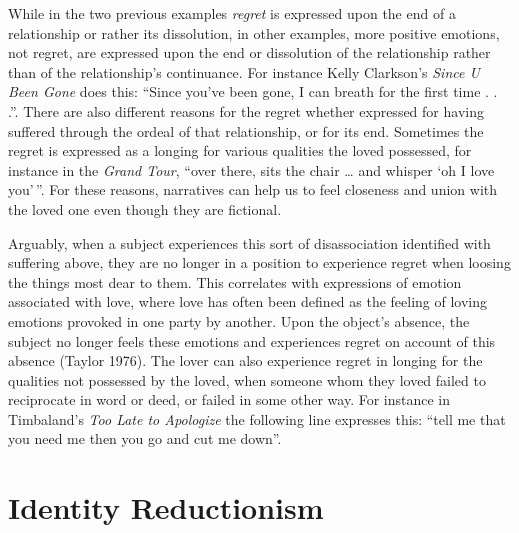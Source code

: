 \documentclass[
  letterpaper,
  DIV=11,
  numbers=noendperiod]{scrreprt}
\begin{document}
\begin{tcolorbox}[enhanced jigsaw, arc=.35mm, breakable, rightrule=.15mm, colback=white, colframe=quarto-callout-important-color-frame, bottomrule=.15mm, leftrule=.75mm, opacityback=0, toprule=.15mm, left=2mm]
\begin{tcolorbox}[enhanced jigsaw, arc=.35mm, breakable, rightrule=.15mm, colback=white, colframe=quarto-callout-tip-color-frame, bottomrule=.15mm, leftrule=.75mm, opacityback=0, toprule=.15mm, left=2mm]
While in the two previous examples \emph{regret} is expressed upon the
end of a relationship or rather its dissolution, in other examples, more
positive emotions, not regret, are expressed upon the end or dissolution
of the relationship rather than of the relationship's continuance. For
instance Kelly Clarkson's \emph{Since U Been Gone} does this: ``Since
you've been gone, I can breath for the first time . . .''. There are
also different reasons for the regret whether expressed for having
suffered through the ordeal of that relationship, or for its end.
Sometimes the regret is expressed as a longing for various qualities the
loved possessed, for instance in the \emph{Grand Tour}, ``over there,
sits the chair \ldots{} and whisper `oh I love you'\,''. For these
reasons, narratives can help us to feel closeness and union with the
loved one even though they are fictional.

Arguably, when a subject experiences this sort of disassociation
identified with suffering above, they are no longer in a position to
experience regret when loosing the things most dear to them. This
correlates with expressions of emotion associated with love, where love
has often been defined as the feeling of loving emotions provoked in one
party by another. Upon the object's absence, the subject no longer feels
these emotions and experiences regret on account of this absence (Taylor
1976). The lover can also experience regret in longing for the qualities
not possessed by the loved, when someone whom they loved failed to
reciprocate in word or deed, or failed in some other way. For instance
in Timbaland's \emph{Too Late to Apologize} the following line expresses
this: ``tell me that you need me then you go and cut me down''.

\section{Identity Reductionism}\label{identity-reductionism}


\end{tcolorbox}
\end{tcolorbox}
\end{document}

